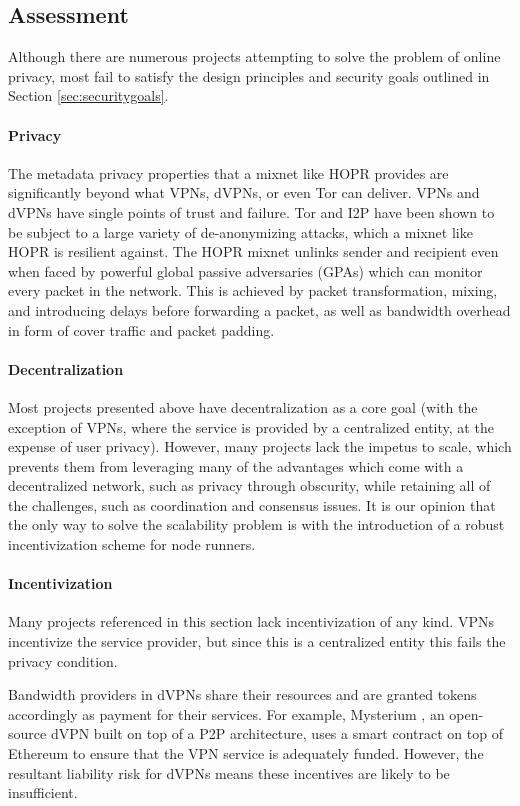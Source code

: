 \subsection{Assessment}

Although there are numerous projects attempting to solve the problem of online privacy, most fail to satisfy the design principles and security goals outlined in Section \ref{sec:securitygoals}.

\paragraph{Privacy} The metadata privacy properties that a mixnet like HOPR provides are significantly beyond what VPNs, dVPNs, or even Tor can deliver. VPNs and dVPNs have single points of trust and failure. Tor and I2P have been shown to be subject to a large variety of de-anonymizing attacks, which a mixnet like HOPR is resilient against. The HOPR mixnet unlinks sender and recipient even when faced by powerful global passive adversaries (GPAs) which can monitor every packet in the network. This is achieved by packet transformation, mixing, and introducing delays before forwarding a packet, as well as bandwidth overhead in form of cover traffic and packet padding.

\paragraph{Decentralization} Most projects presented above have decentralization as a core goal (with the exception of VPNs, where the service is provided by a centralized entity, at the expense of user privacy). However, many projects lack the impetus to scale, which prevents them from leveraging many of the advantages which come with a decentralized network, such as privacy through obscurity, while retaining all of the challenges, such as coordination and consensus issues. It is our opinion that the only way to solve the scalability problem is with the introduction of a robust incentivization scheme for node runners.

\paragraph{Incentivization} Many projects referenced in this section lack incentivization of any kind. VPNs incentivize the service provider, but since this is a centralized entity this fails the privacy condition.

Bandwidth providers in dVPNs share their resources and are granted tokens accordingly as payment for their services. For example, Mysterium \cite{mysterium}, an open-source dVPN built on top of a P2P architecture, uses a smart contract on top of Ethereum to ensure that the VPN service is adequately funded. However, the resultant liability risk for dVPNs means these incentives are likely to be insufficient.

